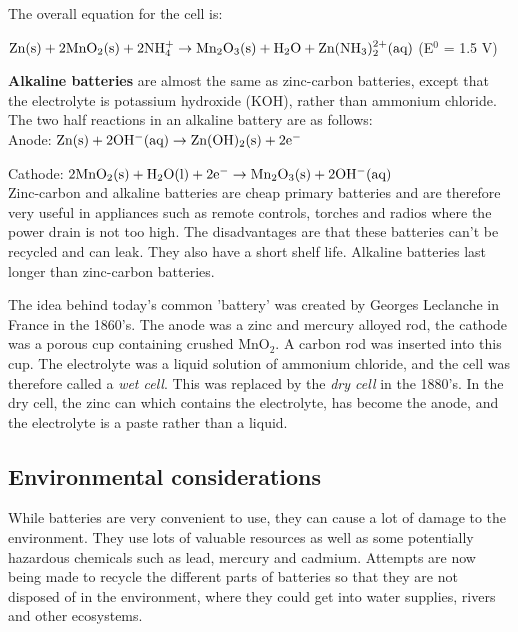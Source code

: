The overall equation for the cell is:

\begin{center}
$\rm{Zn(s) + 2MnO_{2}(s) + 2NH_{4}^{+} \rightarrow Mn_{2}O_{3}(s) + H_{2}O + Zn(NH_{3})_{2}^{2+}(aq)}$ (E$^{0}$ = 1.5 V)
\end{center}

\textbf{Alkaline batteries} are almost the same as zinc-carbon batteries, except that the electrolyte is potassium hydroxide (KOH), rather than ammonium chloride. The two half reactions in an alkaline battery are as follows:\\

Anode: $\rm{Zn(s) + 2OH^{-}(aq) \rightarrow Zn(OH)_{2}(s) + 2e^{-}}$

Cathode: $\rm{2MnO_{2}(s) + H_{2}O(l) + 2e^{-} \rightarrow Mn_{2}O_{3}(s) + 2OH^{-}(aq)}$\\


Zinc-carbon and alkaline batteries are cheap primary batteries and are therefore very useful in appliances such as remote controls, torches and radios where the power drain is not too high. The disadvantages are that these batteries can't be recycled and can leak. They also have a short shelf life. Alkaline batteries last longer than zinc-carbon batteries.

\begin{IFact}{
The idea behind today's common 'battery' was created by Georges Leclanche in France in the 1860's. The anode was a zinc and mercury alloyed rod, the cathode was a porous cup containing crushed MnO$_{2}$. A carbon rod was inserted into this cup. The electrolyte was a liquid solution of ammonium chloride, and the cell was therefore called a \textit{wet cell}. This was replaced by the \textit{dry cell} in the 1880's. In the dry cell, the zinc can which contains the electrolyte, has become the anode, and the electrolyte is a paste rather than a liquid. 
}
\end{IFact} 

\subsection{Environmental considerations}

While batteries are very convenient to use, they can cause a lot of damage to the environment. They use lots of valuable resources as well as some potentially hazardous chemicals such as lead, mercury and cadmium. Attempts are now being made to recycle the different parts of batteries so that they are not disposed of in the environment, where they could get into water supplies, rivers and other ecosystems.

